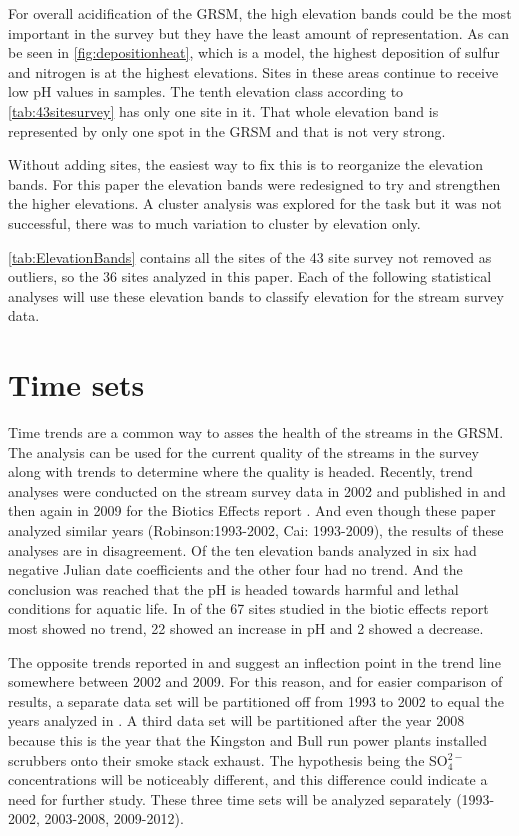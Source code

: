 For overall acidification of the GRSM, the high elevation bands could be the most important in the survey but they have the least amount of representation.
As can be seen in \autoref{fig:depositionheat}, which is a model, the highest deposition of sulfur and nitrogen is at the highest elevations.
Sites in these areas continue to receive low pH values in samples.
The tenth elevation class according to \autoref{tab:43sitesurvey} has only one site in it.
That whole elevation band is represented by only one spot in the GRSM and that is not very strong.

Without adding sites, the easiest way to fix this is to reorganize the elevation bands. 
For this paper the elevation bands were redesigned to try and strengthen the higher elevations.
A cluster analysis was explored for the task but it was not successful, there was to much variation to cluster by elevation only.



\autoref{tab:ElevationBands} contains all the sites of the 43 site survey not removed as outliers, so the 36 sites analyzed in this paper.
Each of the following statistical analyses will use these elevation bands to classify elevation for the stream survey data.

\section{Time sets}

Time trends are a common way to asses the health of the streams in the GRSM.
The analysis can be used for the current quality of the streams in the survey along with trends to determine where the quality is headed. 
Recently, trend analyses were conducted on the stream survey data in 2002 and published in \citet{robinson2008ph} and then again in 2009 for the Biotics Effects report \citep{cai2012}.
And even though these paper analyzed similar years (Robinson:1993-2002, Cai: 1993-2009), the results of these analyses are in disagreement.
Of the ten elevation bands analyzed in \citet{robinson2008ph} six had negative Julian date coefficients and the other four had no trend.
And the conclusion was reached that the pH is headed towards harmful and lethal conditions for aquatic life. 
In \citet{cai2012} of the 67 sites studied in the biotic effects report most showed no trend, 22 showed an increase in pH and 2 showed a decrease. 

The opposite trends reported in  \citet{robinson2008ph} and \citet{cai2012} suggest an inflection point in the trend line somewhere between 2002 and 2009. 
For this reason, and for easier comparison of results,  a separate data set will be partitioned off from 1993 to 2002 to equal the years analyzed in \citet{robinson2008ph}.  
A third data set will be partitioned after the year 2008 because this is the year that the Kingston and Bull run power plants installed scrubbers onto their smoke stack exhaust. 
The hypothesis being the SO$_4^{2-}$ concentrations will be noticeably different, and this difference could indicate a need for further study. 
These three time sets will be analyzed separately (1993-2002, 2003-2008, 2009-2012).

